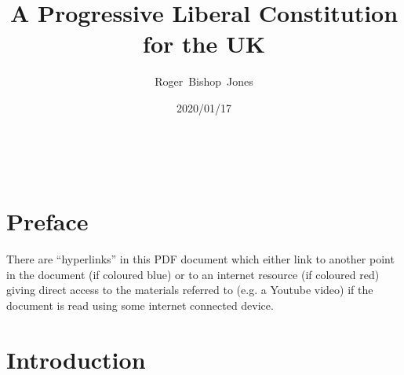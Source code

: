 \documentclass[14pt,titlepage]{extarticle}
\title{A Progressive Liberal Constitution for the UK}
\author{Roger~Bishop~Jones}
\date{\small 2020/01/17}
\newcommand{\ignore}[1]{}
\begin{document}

                               
\begin{titlepage}
\maketitle





\end{titlepage}

\ \

\ignore{
\begin{centering}
{\LARGE \bf A \\Progressive Liberal Constitution \\for the UK}
\end{centering}
}%

\setcounter{tocdepth}{2}
{\parskip-0pt\tableofcontents}




\section*{Preface}



There are ``hyperlinks'' in this PDF document which either link to another point in the document  (if coloured blue) or to an internet resource  (if coloured red) giving direct access to the materials referred to (e.g. a Youtube video) if the document is read using some internet connected device.

\section{Introduction}
\end{document}
